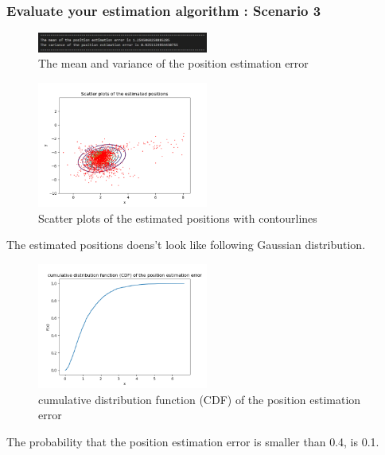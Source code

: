 \documentclass[a4paper]{article}
\begin{document}
\clearpage
\subsubsection{Evaluate your estimation algorithm : Scenario 3}
\begin{figure}[h]
	\begin{center}
		\includegraphics[width=0.5\textwidth]{mean_variance_error3.jpg}
		\caption{The mean and variance of the position estimation error}
	\end{center}
\end{figure}
\begin{figure}[h]
	\begin{center}
		\includegraphics[width=0.5\textwidth]{plotcon3.png}
		\caption{Scatter plots of the estimated positions with contourlines}
	\end{center}
\end{figure}
The estimated positions doens't look like following Gaussian distribution.
\begin{figure}[h]
	\begin{center}		
		\includegraphics[width=0.5\textwidth]{CDF3.png}
		\caption{cumulative distribution function (CDF) of the position estimation error}
	\end{center}
\end{figure}

The probability that the position estimation error is smaller than 0.4, is 0.1.\\
\end{document}
